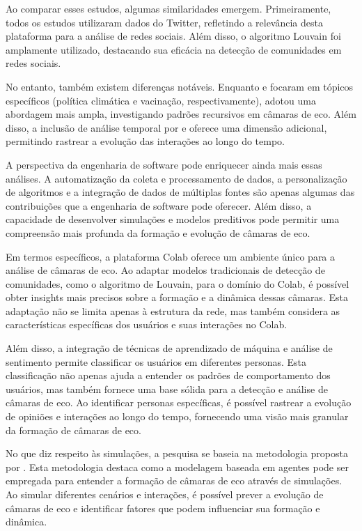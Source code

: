 Ao comparar esses estudos, algumas similaridades emergem. Primeiramente, todos os estudos utilizaram dados do Twitter, refletindo a relevância desta plataforma para a análise de redes sociais. Além disso, o algoritmo Louvain foi amplamente utilizado, destacando sua eficácia na detecção de comunidades em redes sociais.

No entanto, também existem diferenças notáveis. Enquanto  e  focaram em tópicos específicos (política climática e vacinação, respectivamente),  adotou uma abordagem mais ampla, investigando padrões recursivos em câmaras de eco. Além disso, a inclusão de análise temporal por  e  oferece uma dimensão adicional, permitindo rastrear a evolução das interações ao longo do tempo.

A perspectiva da engenharia de software pode enriquecer ainda mais essas análises. A automatização da coleta e processamento de dados, a personalização de algoritmos e a integração de dados de múltiplas fontes são apenas algumas das contribuições que a engenharia de software pode oferecer. Além disso, a capacidade de desenvolver simulações e modelos preditivos pode permitir uma compreensão mais profunda da formação e evolução de câmaras de eco.

Em termos específicos, a plataforma Colab oferece um ambiente único para a análise de câmaras de eco. Ao adaptar modelos tradicionais de detecção de comunidades, como o algoritmo de Louvain, para o domínio do Colab, é possível obter insights mais precisos sobre a formação e a dinâmica dessas câmaras. Esta adaptação não se limita apenas à estrutura da rede, mas também considera as características específicas dos usuários e suas interações no Colab.

Além disso, a integração de técnicas de aprendizado de máquina e análise de sentimento permite classificar os usuários em diferentes personas. Esta classificação não apenas ajuda a entender os padrões de comportamento dos usuários, mas também fornece uma base sólida para a detecção e análise de câmaras de eco. Ao identificar personas específicas, é possível rastrear a evolução de opiniões e interações ao longo do tempo, fornecendo uma visão mais granular da formação de câmaras de eco.

No que diz respeito às simulações, a pesquisa se baseia na metodologia proposta por . Esta metodologia destaca como a modelagem baseada em agentes pode ser empregada para entender a formação de câmaras de eco através de simulações. Ao simular diferentes cenários e interações, é possível prever a evolução de câmaras de eco e identificar fatores que podem influenciar sua formação e dinâmica.